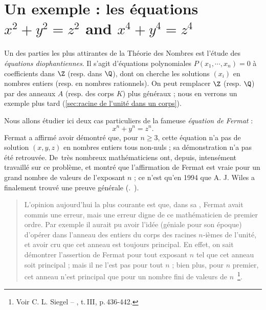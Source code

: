 \documentclass[11pt, %
  title in boldface,
  theorem in new line,
  theorem numbering = section,
  number theorems separately,
  simple name,
]{beaulivre}
\begin{document}
\section{Un exemple : les équations \texorpdfstring{\( x^2 + y^2 = z^2 \)}{x\textasciicircum 2+y\textasciicircum 2=z\textasciicircum 2} and \texorpdfstring{\( x^4 + y^4 = z^4 \)}{x\textasciicircum 4+y\textasciicircum 4=z\textasciicircum 4}}\label{sec:l'équation de Fermat;cas 2 et 4}

    Un des parties les plus attirantes de la Théorie des Nombres est l'étude des \emph{équations diophantiennes}. Il s'agit d'équations polynomiales \( P(x_1, \cdots, x_n) = 0 \) à coefficients dans \( \Z \) (resp. dans \( \Q \)), dont on cherche les solutions \( (x_i) \) en nombres entiers (resp. en nombres rationnels). On peut remplacer \( \Z \) (resp. \( \Q \)) par des anneaux \( A \) (resp. des corps \( K \)) plus généraux ; nous en verrons un exemple plus tard (\cref{sec:racine de l'unité dans un corps}).

    Nous allons étudier ici deux cas particuliers de la fameuse \emph{équation de Fermat} :
    \begin{equation}
        x^n+y^n=z^n.\label{eq:fermat}
    \end{equation}
    Fermat a affirmé avoir démontré que, pour \( n \geqslant 3 \), cette équation n'a pas de solution \( (x,y,z) \) en nombres entiers tous non-nuls ; sa démonstration n'a pas été retrouvée. De~très nombreux mathématiciens ont, depuis, intensément travaillé sur ce problème, et montré que l'affirmation de Fermat est vraie pour un grand nombre de valeurs de l'exposant \( n \) ; ce n'est qu'en 1994 que A. J. Wiles a finalement trouvé une preuve générale (\cf.~\cite{wiles1994}).

    \begin{quote}
        L'opinion aujourd'hui la plus courante est que, dans sa , Fermat avait commis une erreur, mais une erreur digne de ce mathématicien de premier ordre. Par exemple il aurait pu avoir l'idée (géniale pour son époque) d'opérer dans l'anneau des entiers du corps des racines \( n \)‑ièmes de l'unité, et avoir cru que cet anneau est toujours principal. En effet, on sait démontrer l'assertion de Fermat pour tout exposant \( n \) tel que cet anneau soit principal ; mais il ne l'est pas pour tout \( n \) ; bien plus, pour \( n \) premier, cet anneau n'est principal que pour un nombre fini de valeurs de \( n \)~\footnote{Voir C. L. Siegel -- , t.\,III, p.\,436-442.}.
    \end{quote}
\end{document}

